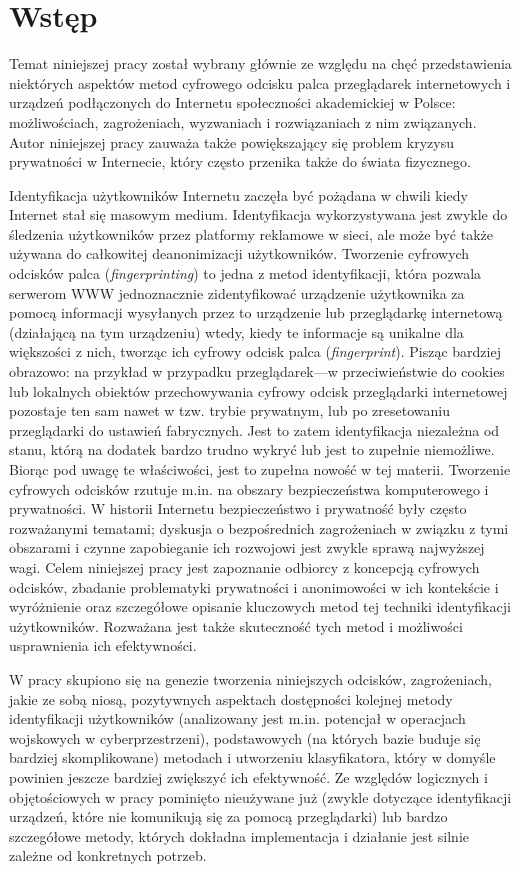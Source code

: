 \chapter*{Wstęp}
Temat niniejszej pracy został wybrany głównie ze względu na chęć przedstawienia
niektórych aspektów metod cyfrowego odcisku palca przeglądarek internetowych i
urządzeń podłączonych do Internetu społeczności akademickiej w Polsce:
możliwościach, zagrożeniach, wyzwaniach i rozwiązaniach z nim związanych. Autor
niniejszej pracy zauważa także powiększający się problem kryzysu prywatności w
Internecie, który często przenika także do świata fizycznego.

Identyfikacja użytkowników Internetu zaczęła być pożądana w chwili kiedy
Internet stał się masowym medium. Identyfikacja wykorzystywana jest zwykle do
śledzenia użytkowników przez platformy reklamowe w sieci, ale może być także
używana do całkowitej deanonimizacji użytkowników. Tworzenie cyfrowych odcisków
palca (\emph{fingerprinting}) to jedna z metod identyfikacji, która pozwala
serwerom WWW jednoznacznie zidentyfikować urządzenie użytkownika za pomocą
informacji wysyłanych przez to urządzenie lub przeglądarkę internetową
(działającą na tym urządzeniu) wtedy, kiedy te informacje są unikalne dla
większości z nich, tworząc ich cyfrowy odcisk palca (\emph{fingerprint}). Pisząc
bardziej obrazowo: na przykład w przypadku przeglądarek---w przeciwieństwie do
cookies lub lokalnych obiektów przechowywania cyfrowy odcisk przeglądarki
internetowej pozostaje ten sam nawet w tzw. trybie prywatnym, lub po
zresetowaniu przeglądarki do ustawień fabrycznych. Jest to zatem identyfikacja
niezależna od stanu, którą na dodatek bardzo trudno wykryć lub jest to zupełnie
niemożliwe. Biorąc pod uwagę te właściwości, jest to zupełna nowość w tej
materii. Tworzenie cyfrowych odcisków rzutuje m.in. na obszary bezpieczeństwa
komputerowego i prywatności. W historii Internetu bezpieczeństwo i prywatność
były często rozważanymi tematami; dyskusja o bezpośrednich zagrożeniach w
związku z tymi obszarami i czynne zapobieganie ich rozwojowi jest zwykle sprawą
najwyższej wagi. Celem niniejszej pracy jest zapoznanie odbiorcy z koncepcją
cyfrowych odcisków, zbadanie problematyki prywatności i anonimowości w ich
kontekście i wyróżnienie oraz szczegółowe opisanie kluczowych metod tej techniki
identyfikacji użytkowników. Rozważana jest także skuteczność tych metod i
możliwości usprawnienia ich efektywności.

W pracy skupiono się na genezie tworzenia niniejszych odcisków, zagrożeniach,
jakie ze sobą niosą, pozytywnych aspektach dostępności kolejnej metody
identyfikacji użytkowników (analizowany jest m.in. potencjał w operacjach
wojskowych w cyberprzestrzeni), podstawowych (na których bazie buduje się
bardziej skomplikowane) metodach i utworzeniu klasyfikatora, który w domyśle
powinien jeszcze bardziej zwiększyć ich efektywność. Ze względów logicznych i
objętościowych w pracy pominięto nieużywane już (zwykle dotyczące identyfikacji
urządzeń, które nie komunikują się za pomocą przeglądarki) lub bardzo
szczegółowe metody, których dokładna implementacja i działanie jest silnie
zależne od konkretnych potrzeb.

